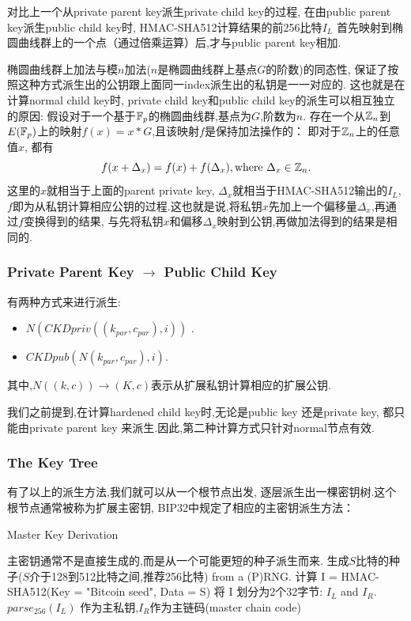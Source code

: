 对比上一个从private parent key派生private child key的过程,
在由public parent key派生public child key时, HMAC-SHA512计算结果的前256比特$I_L$
首先映射到椭圆曲线群上的一个点（通过倍乘运算）后,才与public parent key相加.

椭圆曲线群上加法与模$n$加法($n$是椭圆曲线群上基点$G$的阶数)的同态性,
保证了按照这种方式派生出的公钥跟上面同一index派生出的私钥是一一对应的.
这也就是在计算normal child key时, private child key和public child key的派生可以相互独立的原因:
假设对于一个基于$\mathbb{F}_p$的椭圆曲线群,基点为$G$,阶数为$n$.
存在一个从$\mathbb{Z}_n$到$E(\mathbb{F}_p)$上的映射$f(x)=x*G$,且该映射$f$是保持加法操作的：
即对于$\mathbb{Z}_n$上的任意值$x$, 都有
$$ f(x+\Delta_x)=f(x)+f(\Delta_x), \text{where}\ \Delta_x \in \mathbb{Z}_n.$$   
这里的$x$就相当于上面的parent private key, $\Delta_x$就相当于HMAC-SHA512输出的$I_L$,
$f$即为从私钥计算相应公钥的过程.这也就是说,将私钥$x$先加上一个偏移量$\Delta_x$,再通过$f$变换得到的结果,
与先将私钥$x$和偏移$\Delta_x$映射到公钥,再做加法得到的结果是相同的.

\subsubsection{Private Parent Key $\rightarrow$ Public Child Key}

有两种方式来进行派生:
\begin{itemize}
\item $N(CKDpriv((k_{par}, c_{par}), i))$ .  
\item $CKDpub(N(k_{par}, c_{par}), i)$. 
\end{itemize}
其中,$N((k, c)) \rightarrow (K, c)$表示从扩展私钥计算相应的扩展公钥.

我们之前提到,在计算hardened child key时,无论是public key 还是private key,
都只能由private parent key 来派生.因此,第二种计算方式只针对normal节点有效.


\subsubsection{The Key Tree}

有了以上的派生方法,我们就可以从一个根节点出发, 逐层派生出一棵密钥树.这个根节点通常被称为扩展主密钥,
BIP32中规定了相应的主密钥派生方法：

\begin{algorithm}[tbp]\footnotesize
\caption{Master Key Derivation}
  	\begin{algorithmic}[1]
	    	\STATE 主密钥通常不是直接生成的,而是从一个可能更短的种子派生而来.
		\STATE 生成$S$比特的种子($S$介于128到512比特之间,推荐256比特) from a (P)RNG.
		\STATE 计算 I = HMAC-SHA512(Key = "Bitcoin seed", Data = S)
		\STATE 将 I 划分为2个32字节: $I_L$ and $I_R$.
		\STATE  $parse_{256}(I_L)$ 作为主私钥,$I_R$作为主链码(master chain code)
    \end{algorithmic}
\end{algorithm}


